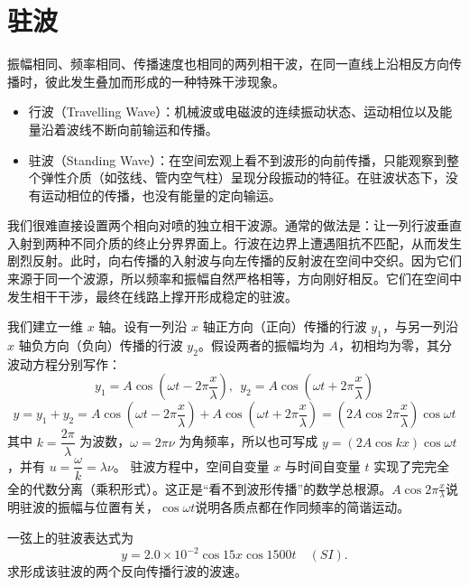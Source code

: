 
\section{驻波}

\begin{definition}[驻波]
振幅相同、频率相同、传播速度也相同的两列相干波，在同一直线上沿相反方向传播时，彼此发生叠加而形成的一种特殊干涉现象。
\begin{itemize}
\item 行波（Travelling Wave）：机械波或电磁波的连续振动状态、运动相位以及能量沿着波线不断向前输运和传播。
\item 驻波（Standing Wave）：在空间宏观上看不到波形的向前传播，只能观察到整个弹性介质（如弦线、管内空气柱）呈现分段振动的特征。在驻波状态下，没有运动相位的传播，也没有能量的定向输运。
\end{itemize}
\end{definition}

\begin{note}
我们很难直接设置两个相向对喷的独立相干波源。通常的做法是：让一列行波垂直入射到两种不同介质的终止分界界面上。行波在边界上遭遇阻抗不匹配，从而发生剧烈反射。此时，向右传播的入射波与向左传播的反射波在空间中交织。因为它们来源于同一个波源，所以频率和振幅自然严格相等，方向刚好相反。它们在空间中发生相干干涉，最终在线路上撑开形成稳定的驻波。
\end{note}

\begin{theorem}[驻波方程]
我们建立一维 $x$ 轴。设有一列沿 $x$ 轴正方向（正向）传播的行波 $y_1$，与另一列沿 $x$ 轴负方向（负向）传播的行波 $y_2$。假设两者的振幅均为 $A$，初相均为零，其分波动方程分别写作：$$y_1 = A \cos \left( \omega t - 2\pi \frac{x}{\lambda} \right),~~y_2 = A \cos \left( \omega t + 2\pi \frac{x}{\lambda} \right)$$
$$y = y_1 + y_2 = A \cos \left( \omega t - 2\pi \frac{x}{\lambda} \right) + A \cos \left( \omega t + 2\pi \frac{x}{\lambda} \right) = \left( 2A \cos 2\pi \frac{x}{\lambda} \right) \cos \omega t$$
其中 \(k=\dfrac{2\pi}{\lambda}\) 为波数，\(\omega=2\pi\nu\) 为角频率，所以也可写成 \(y=(2A\cos kx)\cos\omega t\)，并有 \(u=\dfrac{\omega}{k}=\lambda\nu\)。
驻波方程中，空间自变量 $x$ 与时间自变量 $t$ 实现了完完全全的代数分离（乘积形式）。这正是“看不到波形传播”的数学总根源。$A \cos 2\pi \frac{x}{\lambda}$说明驻波的振幅与位置有关，$\cos\omega t$说明各质点都在作同频率的简谐运动。
\end{theorem}

\begin{exercise}
一弦上的驻波表达式为
\[
y=2.0\times10^{-2}\cos 15x\cos1500t\quad(\si{SI}).
\]
求形成该驻波的两个反向传播行波的波速。
\end{exercise}

